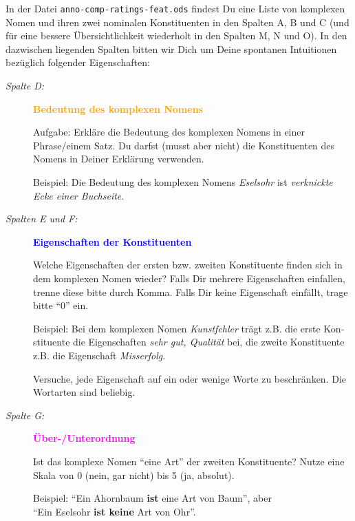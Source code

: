 \documentclass[output=paper,colorlinks,citecolor=brown]{langscibook}
\begin{document}
\begin{otherlanguage}{ngerman}

In der Datei \texttt{anno-comp-ratings-feat.ods} findest Du eine Liste
von komplexen Nomen und ihren zwei nominalen Konstituenten in den
Spalten A, B und C (und für eine bessere Übersichtlichkeit wiederholt
in den Spalten M, N und O). In den dazwischen liegenden Spalten bitten
wir Dich um Deine spontanen Intuitionen bezüglich folgender
Eigenschaften:

\begin{description}
\item[\textit{Spalte D:}] \textcolor{orange}{\textbf{Bedeutung des komplexen Nomens}}

  Aufgabe: Erkläre die Bedeutung des komplexen Nomens in einer
  Phrase\slash einem Satz. Du darfst (musst aber nicht) die Konstituenten
  des Nomens in Deiner Erklärung verwenden.

  Beispiel: Die Bedeutung des komplexen Nomens \textit{Eselsohr} ist \textit{verknickte Ecke einer Buchseite}.

\item[\textit{Spalten E und F:}] \textcolor{blue}{\textbf{Eigenschaften der Konstituenten}}

  Welche Eigenschaften der ersten bzw. zweiten Konstituente finden
  sich in dem komplexen Nomen wieder? Falls Dir mehrere Eigenschaften
  einfallen, trenne diese bitte durch Komma. Falls Dir keine
  Eigenschaft einfällt, trage bitte ``0'' ein.

  Beispiel: Bei dem komplexen Nomen \textit{Kunstfehler} trägt
  z.B. die erste Konstituente die Eigenschaften \textit{sehr gut,
    Qualität} bei, die zweite Konstituente z.B. die Eigenschaft
  \textit{Misserfolg}.

  Versuche, jede Eigenschaft auf ein oder wenige Worte zu
  beschränken. Die Wortarten sind beliebig.

\item[\textit{Spalte G:}] \textcolor{magenta}{\textbf{Über-/Unterordnung}}

  Ist das komplexe Nomen ``eine Art'' der zweiten Konstituente? Nutze
  eine Skala von 0 (nein, gar nicht) bis 5 (ja, absolut).

  Beispiel: ``Ein Ahornbaum \textbf{ist} eine Art von Baum'', aber\\\hspace*{+1.4cm}``Ein Eselsohr \textbf{ist keine} Art von Ohr''.


\end{description}
\end{otherlanguage}
\end{document}
